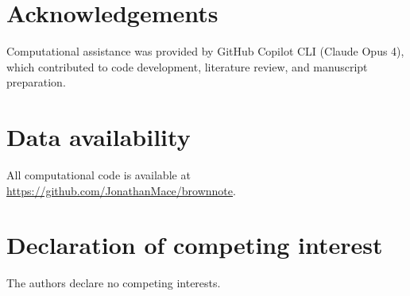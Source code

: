 \documentclass[12pt]{article}
\begin{document}
\section*{Acknowledgements}
Computational assistance was provided by GitHub Copilot CLI (Claude Opus 4),
which contributed to code development, literature review, and manuscript
preparation.

\section*{Data availability}
All computational code is available at \url{https://github.com/JonathanMace/brownnote}.

\section*{Declaration of competing interest}
The authors declare no competing interests.




\end{document}
